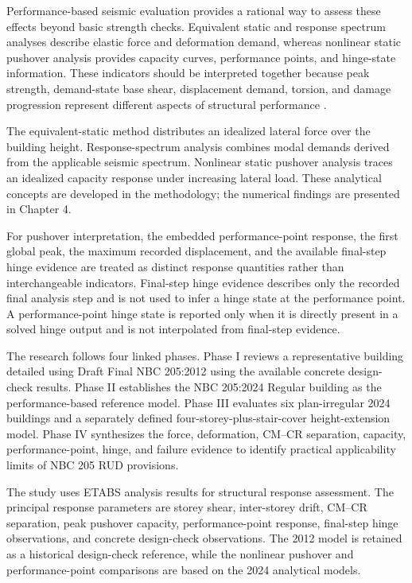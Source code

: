 Performance-based seismic evaluation provides a rational way to assess these effects beyond basic strength checks. Equivalent static and response spectrum analyses describe elastic force and deformation demand, whereas nonlinear static pushover analysis provides capacity curves, performance points, and hinge-state information. These indicators should be interpreted together because peak strength, demand-state base shear, displacement demand, torsion, and damage progression represent different aspects of structural performance \cite{atc1996atc40,fema2005fema440,asce2017asce41}.

The equivalent-static method distributes an idealized lateral force over the building height. Response-spectrum analysis combines modal demands derived from the applicable seismic spectrum. Nonlinear static pushover analysis traces an idealized capacity response under increasing lateral load. These analytical concepts are developed in the methodology; the numerical findings are presented in Chapter 4.

For pushover interpretation, the embedded performance-point response, the first global peak, the maximum recorded displacement, and the available final-step hinge evidence are treated as distinct response quantities rather than interchangeable indicators. Final-step hinge evidence describes only the recorded final analysis step and is not used to infer a hinge state at the performance point. A performance-point hinge state is reported only when it is directly present in a solved hinge output and is not interpolated from final-step evidence.

The research follows four linked phases. Phase I reviews a representative building detailed using Draft Final NBC 205:2012 using the available concrete design-check results. Phase II establishes the NBC 205:2024 Regular building as the performance-based reference model. Phase III evaluates six plan-irregular 2024 buildings and a separately defined four-storey-plus-stair-cover height-extension model. Phase IV synthesizes the force, deformation, CM--CR separation, capacity, performance-point, hinge, and failure evidence to identify practical applicability limits of NBC 205 RUD provisions.

The study uses ETABS analysis results for structural response assessment. The principal response parameters are storey shear, inter-storey drift, CM--CR separation, peak pushover capacity, performance-point response, final-step hinge observations, and concrete design-check observations. The 2012 model is retained as a historical design-check reference, while the nonlinear pushover and performance-point comparisons are based on the 2024 analytical models.

